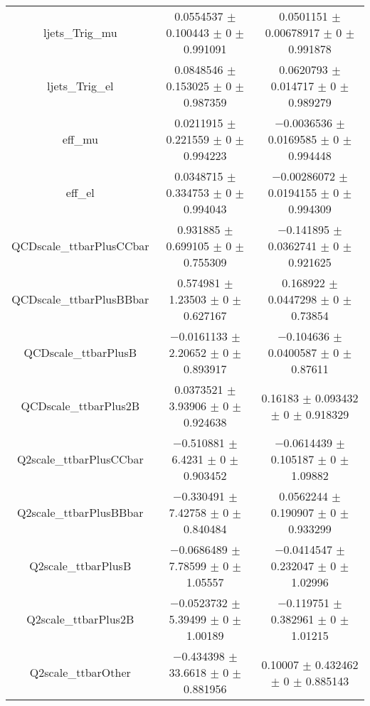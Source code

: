 \begin{table}
\begin{tabular}{ccc}
ljets\_Trig\_mu & \num{0.0554537} $\pm$ \num{0.100443} $\pm$ \num{0} $\pm$ \num{0.991091} & \num{0.0501151} $\pm$ \num{0.00678917} $\pm$ \num{0} $\pm$ \num{0.991878}\\
ljets\_Trig\_el & \num{0.0848546} $\pm$ \num{0.153025} $\pm$ \num{0} $\pm$ \num{0.987359} & \num{0.0620793} $\pm$ \num{0.014717} $\pm$ \num{0} $\pm$ \num{0.989279}\\
eff\_mu & \num{0.0211915} $\pm$ \num{0.221559} $\pm$ \num{0} $\pm$ \num{0.994223} & \num{-0.0036536} $\pm$ \num{0.0169585} $\pm$ \num{0} $\pm$ \num{0.994448}\\
eff\_el & \num{0.0348715} $\pm$ \num{0.334753} $\pm$ \num{0} $\pm$ \num{0.994043} & \num{-0.00286072} $\pm$ \num{0.0194155} $\pm$ \num{0} $\pm$ \num{0.994309}\\
QCDscale\_ttbarPlusCCbar & \num{0.931885} $\pm$ \num{0.699105} $\pm$ \num{0} $\pm$ \num{0.755309} & \num{-0.141895} $\pm$ \num{0.0362741} $\pm$ \num{0} $\pm$ \num{0.921625}\\
QCDscale\_ttbarPlusBBbar & \num{0.574981} $\pm$ \num{1.23503} $\pm$ \num{0} $\pm$ \num{0.627167} & \num{0.168922} $\pm$ \num{0.0447298} $\pm$ \num{0} $\pm$ \num{0.73854}\\
QCDscale\_ttbarPlusB & \num{-0.0161133} $\pm$ \num{2.20652} $\pm$ \num{0} $\pm$ \num{0.893917} & \num{-0.104636} $\pm$ \num{0.0400587} $\pm$ \num{0} $\pm$ \num{0.87611}\\
QCDscale\_ttbarPlus2B & \num{0.0373521} $\pm$ \num{3.93906} $\pm$ \num{0} $\pm$ \num{0.924638} & \num{0.16183} $\pm$ \num{0.093432} $\pm$ \num{0} $\pm$ \num{0.918329}\\
Q2scale\_ttbarPlusCCbar & \num{-0.510881} $\pm$ \num{6.4231} $\pm$ \num{0} $\pm$ \num{0.903452} & \num{-0.0614439} $\pm$ \num{0.105187} $\pm$ \num{0} $\pm$ \num{1.09882}\\
Q2scale\_ttbarPlusBBbar & \num{-0.330491} $\pm$ \num{7.42758} $\pm$ \num{0} $\pm$ \num{0.840484} & \num{0.0562244} $\pm$ \num{0.190907} $\pm$ \num{0} $\pm$ \num{0.933299}\\
Q2scale\_ttbarPlusB & \num{-0.0686489} $\pm$ \num{7.78599} $\pm$ \num{0} $\pm$ \num{1.05557} & \num{-0.0414547} $\pm$ \num{0.232047} $\pm$ \num{0} $\pm$ \num{1.02996}\\
Q2scale\_ttbarPlus2B & \num{-0.0523732} $\pm$ \num{5.39499} $\pm$ \num{0} $\pm$ \num{1.00189} & \num{-0.119751} $\pm$ \num{0.382961} $\pm$ \num{0} $\pm$ \num{1.01215}\\
Q2scale\_ttbarOther & \num{-0.434398} $\pm$ \num{33.6618} $\pm$ \num{0} $\pm$ \num{0.881956} & \num{0.10007} $\pm$ \num{0.432462} $\pm$ \num{0} $\pm$ \num{0.885143}\\

\end{tabular}
\end{table}
